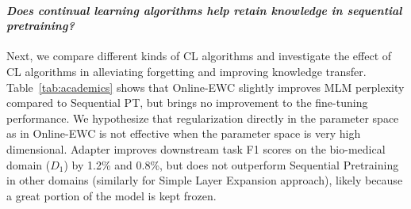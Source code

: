 


\paragraph{\textit{Does continual learning algorithms help retain knowledge in sequential pretraining?}}
Next, we compare different kinds of CL algorithms and investigate the effect of CL algorithms in alleviating forgetting and improving knowledge transfer. %
Table~\ref{tab:academics} shows that Online-EWC slightly improves MLM perplexity compared to  Sequential PT, but brings no improvement to the fine-tuning performance. We hypothesize that regularization directly in the parameter space as in Online-EWC is not effective when the parameter space is very high dimensional.
Adapter improves downstream task F1 scores on the bio-medical domain ($D_1$) by 1.2\% and 0.8\%, 
but does not outperform Sequential Pretraining in other domains (similarly for Simple Layer Expansion approach), %
likely because a great portion of the model is kept frozen. %










